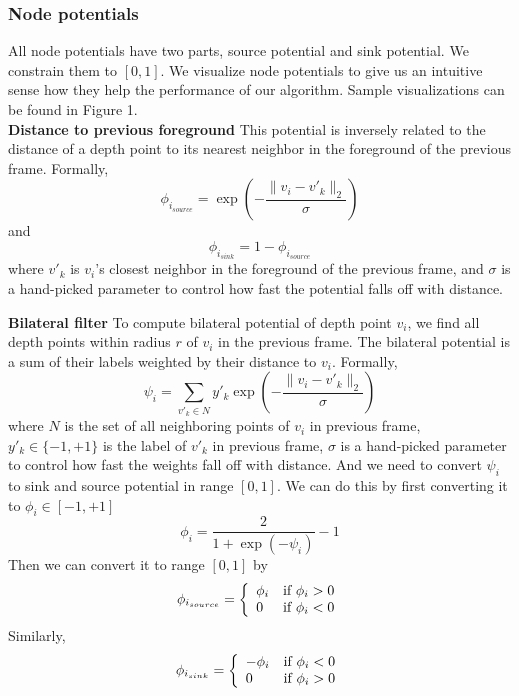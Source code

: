 \documentclass[10pt,twocolumn,letterpaper]{article}
\begin{document}
\subsubsection{Node potentials} All node potentials have two parts, source
potential and sink potential. We constrain them to $[0, 1]$. We visualize
node potentials to give us an intuitive sense how they help the performance
of our algorithm. Sample visualizations can be found in Figure 1.
\\

\indent \textbf{Distance to previous foreground} This potential is inversely related to the distance of a depth point to its nearest neighbor in the
foreground of the previous frame. Formally,
\begin{equation}
\phi_{i_{source}} = \exp\left(-\frac{\|v_i-v'_k\|_2}{\sigma}\right)
\end{equation}
and
\begin{equation}
\phi_{i_{sink}} = 1 - \phi_{i_{source}}
\end{equation}
where $v'_k$ is $v_i$'s closest neighbor in the foreground of the previous frame,
and $\sigma$ is a hand-picked parameter to control how fast the potential falls off
with distance.

\indent \textbf{Bilateral filter}
To compute bilateral potential of depth point $v_i$, we find all depth points within radius $r$ of $v_i$ in the previous frame. The bilateral potential is a sum of their labels weighted by their distance to $v_i$. Formally,
\begin{equation}
\psi_i = \sum_{v'_k\in N} y'_k \exp\left(-\frac{\|v_i - v'_k\|_2}{\sigma}\right)
\end{equation}
where $N$ is the set of all neighboring points of $v_i$ in previous frame,
$y'_k\in\{-1, +1\}$ is the label of $v'_k$ in previous frame, $\sigma$ is a
hand-picked parameter to control how fast the weights fall off with distance.
And we need to convert $\psi_i$ to sink and source potential in range $[0,1]$.
We can do this by first converting it to $\phi_i \in [-1, +1]$
\begin{equation}
\phi_i = \frac{2}{1+\exp(-\psi_i)}-1
\end{equation}
Then we can convert it to range $[0, 1]$ by
\begin{equation}
\phi_{i_{source}} = \left\{\begin{array}{l r}
\phi_i & \text{if $\phi_i > 0$} \\
0 & \text{if $\phi_i < 0$} \\
\end{array} \right.
\end{equation}
Similarly,
\begin{equation}
\phi_{i_{sink}} = \left\{\begin{array}{l r}
-\phi_i & \text{if $\phi_i < 0$} \\
0 & \text{if $\phi_i  > 0$} \\
\end{array} \right.
\end{equation}
\end{document}
